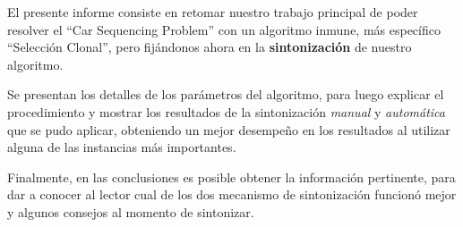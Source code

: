 El presente informe consiste en retomar nuestro trabajo principal
de poder resolver el ``Car Sequencing Problem'' con un algoritmo
inmune, más específico ``Selección Clonal'', pero fijándonos ahora
en la \textbf{sintonización} de nuestro algoritmo.

Se presentan los detalles de los parámetros del algoritmo,
para luego explicar el procedimiento y mostrar los resultados
de la sintonización \emph{manual} y \emph{automática} que se pudo
aplicar, obteniendo un mejor desempeño en los resultados al utilizar
alguna de las instancias más importantes.

Finalmente, en las conclusiones es posible obtener la información
pertinente, para dar a conocer al lector cual de los dos mecanismo
de sintonización funcionó mejor y algunos consejos al momento
de sintonizar.

